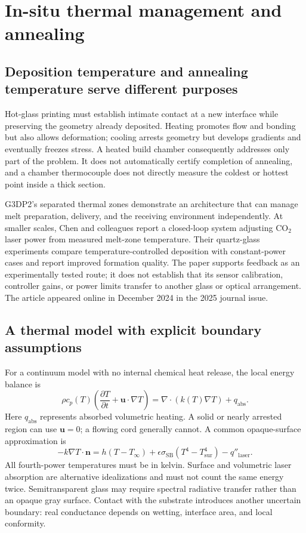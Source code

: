 \section{In-situ thermal management and annealing}
\label{sec:thermal}
\subsection{Deposition temperature and annealing temperature serve different purposes}
Hot-glass printing must establish intimate contact at a new interface while preserving the geometry already deposited. Heating promotes flow and bonding but also allows deformation; cooling arrests geometry but develops gradients and eventually freezes stress. A heated build chamber consequently addresses only part of the problem. It does not automatically certify completion of annealing, and a chamber thermocouple does not directly measure the coldest or hottest point inside a thick section.

G3DP2's separated thermal zones demonstrate an architecture that can manage melt preparation, delivery, and the receiving environment independently.\cite{acad_inamura2018} At smaller scales, Chen and colleagues report a closed-loop system adjusting CO$_2$ laser power from measured melt-zone temperature. Their quartz-glass experiments compare temperature-controlled deposition with constant-power cases and report improved formation quality. The paper supports feedback as an experimentally tested route; it does not establish that its sensor calibration, controller gains, or power limits transfer to another glass or optical arrangement. The article appeared online in December 2024 in the 2025 journal issue.\cite{acad_chen2025}

\subsection{A thermal model with explicit boundary assumptions}
For a continuum model with no internal chemical heat release, the local energy balance is
\begin{equation}
 \rho c_p(T)\left(\frac{\partial T}{\partial t}+\mathbf{u}\cdot\nabla T\right)
 =\nabla\cdot\left(k(T)\nabla T\right)+q_{\mathrm{abs}}.
 \label{eq:thermaltransport}
\end{equation}
Here $q_{\mathrm{abs}}$ represents absorbed volumetric heating. A solid or nearly arrested region can use $\mathbf{u}=0$; a flowing cord generally cannot. A common opaque-surface approximation is
\begin{equation}
 -k\nabla T\cdot\mathbf{n}
 =h(T-T_\infty)+\epsilon\sigma_{\mathrm{SB}}(T^4-T_{\mathrm{sur}}^4)-q''_{\mathrm{laser}}.
\end{equation}
All fourth-power temperatures must be in kelvin. Surface and volumetric laser absorption are alternative idealizations and must not count the same energy twice. Semitransparent glass may require spectral radiative transfer rather than an opaque gray surface. Contact with the substrate introduces another uncertain boundary: real conductance depends on wetting, interface area, and local conformity.

